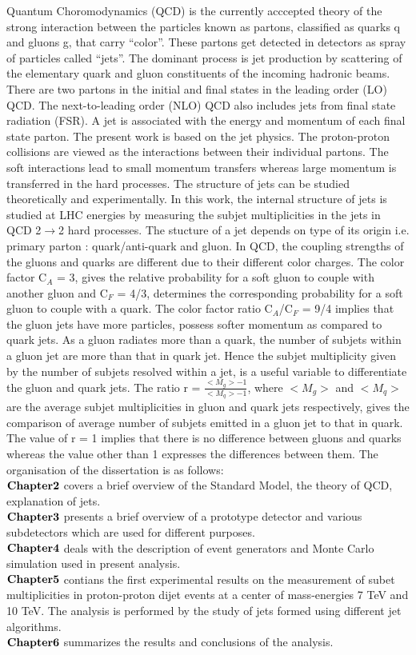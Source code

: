 Quantum Choromodynamics (QCD) is the currently acccepted theory of the strong interaction between the particles known as partons, classified as quarks q and gluons g, that carry ``color''. These partons get detected in detectors as spray of particles called ``jets''. The dominant process is jet production by scattering of the elementary quark and gluon constituents of the incoming hadronic beams. There are two partons in the initial and final states in the leading order (LO) QCD. The next-to-leading order (NLO) QCD also includes jets from final state radiation (FSR). A jet is associated with the energy and momentum of each final state parton. 
The present work is based on the jet physics. The proton-proton collisions are viewed as the interactions between
 their individual partons. The soft interactions lead to small momentum transfers whereas large momentum is transferred in the hard processes. The structure of jets can be studied theoretically and experimentally.
In this work, the internal structure of jets is studied at LHC energies by measuring the subjet multiplicities in the jets in QCD 2$\rightarrow$2 hard processes. The stucture of a jet depends on type of its origin i.e. primary parton : quark/anti-quark and gluon. In QCD, the coupling strengths of the gluons and quarks are different due to their different color charges. The color factor C$_{A}$ = 3, gives the relative probability for a soft gluon to couple with another gluon and C$_{F}$  = 4/3, determines the corresponding probability for a
soft gluon to couple with a quark. The color factor ratio C$_{A}$/C$_{F}$ = 9/4 implies that the gluon jets have more particles, possess softer momentum as compared to quark jets. As a gluon radiates more than a quark, the number of subjets within a gluon jet are more than that in quark jet. Hence the subjet multiplicity given by the number of subjets resolved within a jet, is a useful variable to differentiate the gluon and quark jets. The ratio r = $\frac{<M_{g}> - 1}{<M_{q}> - 1}$, where $<M_{g}>$ and $<M_{q}>$ are the average subjet multiplicities in gluon and quark jets respectively, gives the comparison of average number of subjets emitted in a gluon jet to that in quark. The value of r = 1 implies that there is no difference between gluons and quarks whereas the value other than 1 expresses the differences between them. 
The organisation of the dissertation is as follows:\\
$\bf {Chapter 2}$ covers a brief overview of the Standard Model, the theory of QCD, explanation of jets.\\
$\bf {Chapter 3}$ presents a brief overview of a prototype detector and various subdetectors which are used for different purposes.\\
$\bf {Chapter 4}$ deals with the description of event generators and Monte Carlo simulation used in present analysis. \\
$\bf {Chapter 5}$ contians the first experimental results on the measurement of subet multiplicities in proton-proton dijet events at a center of mass-energies 7 TeV and 10 TeV. The analysis is performed by the study of jets formed using different jet algorithms.\\
$\bf {Chapter 6}$ summarizes the results and conclusions of the analysis.\\
